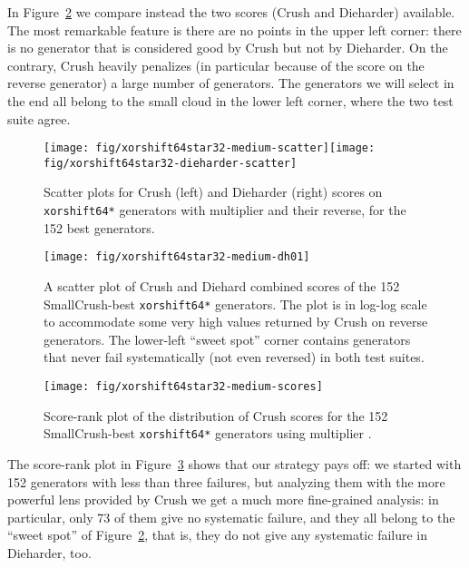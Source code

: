 \documentclass{acmsmalltr}
\newcommand{\xorshifts}[1][]{\texttt{xorshift#1*}\xspace}
\begin{document}
In Figure~\ref{fig:xorshiftlcgdh01} we compare instead the two scores (Crush and
Dieharder) available. The most remarkable feature is there are no points in the upper left corner:
there is no generator that is considered good by Crush but not by Dieharder. On
the contrary, Crush heavily penalizes (in particular because of the score on the
reverse generator) a large number of generators. The generators we will select
in the end all belong to the small cloud in the lower left corner, where the two
test suite agree.

\begin{figure}
\centering
\texttt{[image: fig/xorshift64star32-medium-scatter]}\quad\texttt{[image: fig/xorshift64star32-dieharder-scatter]}
\caption{\label{fig:xorshiftlcgdh01scatter}Scatter plots for Crush (left)
and Dieharder (right) scores on \xorshifts[64] generators with multiplier  and their reverse, for the 152 best
generators.}
\end{figure}

\begin{figure}
\centering
\texttt{[image: fig/xorshift64star32-medium-dh01]}
\caption{\label{fig:xorshiftlcgdh01}A scatter plot of Crush and Diehard
combined scores of the 152 SmallCrush-best \xorshifts[64] generators. The plot is in log-log scale
to accommodate some very high values returned by Crush on reverse
generators. The lower-left ``sweet spot'' corner contains generators
that never fail systematically (not even reversed) in both test suites.}
\end{figure}


\begin{figure}
\centering
\texttt{[image: fig/xorshift64star32-medium-scores]}
\caption{\label{fig:xorshiftlcgmediumscores}
Score-rank plot of the distribution of Crush scores for the 
152 SmallCrush-best \xorshifts[64] generators using multiplier .}
\end{figure}



The score-rank plot in Figure~\ref{fig:xorshiftlcgmediumscores} shows that our strategy
pays off: we started with 152 generators with less than three failures, but
analyzing them with the more powerful lens provided by Crush we get a much
more fine-grained analysis: in particular, only 73 of them give no systematic
failure, and they all belong to the ``sweet spot'' of
Figure~\ref{fig:xorshiftlcgdh01}, that is, they do not give any systematic
failure in Dieharder, too.
\end{document}
